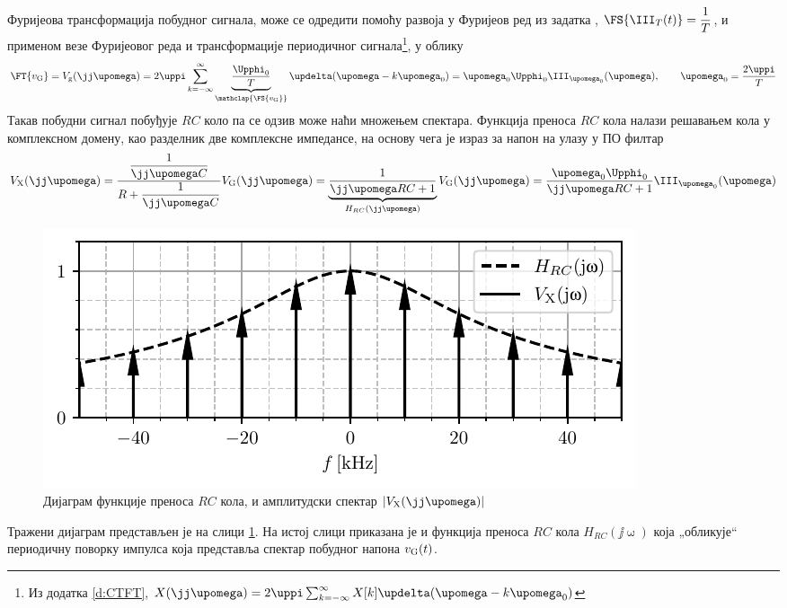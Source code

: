 Фуријеова трансформација побудног сигнала, може се одредити помоћу развоја у Фуријеов ред из
задатка , $\FS{\III_T(t)} = \dfrac{1}{T}$, и применом везе Фуријеовог  
реда и трансформације периодичног сигнала\footnote{Из додатка
\ref{d:CTFT}, 
$
X(\jj\upomega) = 2\uppi \sum_{k = -\infty}^{\infty} X[k] \updelta( \upomega - k \upomega_{\rm 0} )
$
}, у облику 
\begin{equation}
    \FT{v_{\rm G}} = V_{\rm g}(\jj\upomega) = 2\uppi  \sum_{k = -\infty}^{\infty} \underbrace{\dfrac{\Upphi_0}{T}}_{\mathclap{\FS{v_{\rm G}}}} \updelta( \upomega - k \upomega_{\rm 0} )
    = {\upomega_0 \Upphi_0}\III_{\upomega_0}(\upomega), \qquad \upomega_0 = \dfrac{2\uppi}{T}
\end{equation}
Такав побудни сигнал побуђује $RC$ коло па се одзив може наћи множењем спектара. 
Функција преноса $RC$ кола налази решавањем кола у комплексном домену, 
као разделник две комплексне импедансе, на основу чега је израз за напон на улазу у ПО филтар  
\begin{eqnarray}
    V_{\rm X}(\jj\upomega) = \dfrac{ \dfrac{1}{\jj\upomega C} }{ R + \dfrac{1}{\jj\upomega C} } V_{\rm G}(\jj\upomega)
                           = \underbrace{\dfrac{ 1 }{ \jj\upomega RC + 1 }}_{H_{RC}(\jj\upomega)} V_{\rm G}(\jj\upomega)
                           = \dfrac{ {\upomega_0 \Upphi_0} }{ \jj\upomega RC + 1 } \III_{\upomega_0}(\upomega)
\end{eqnarray}
%
\begin{figure}
    \centering
    \includegraphics{fig/comb_snaga_result.pdf}
    \caption{Дијаграм функције преноса $RC$ кола, и амплитудски спектар $|V_{\rm X}(\jj\upomega)|$ }
    \label{fig:\ID.vx}
\end{figure}
%
Тражени дијаграм представљен је на слици \ref{fig:\ID.vx}. На истој слици приказана је и функција преноса $RC$ кола
$H_{RC}(\jj\upomega)$ која „обликује“ периодичну поворку импулса која представља спектар побудног напона $v_{\rm G}(t)$.

